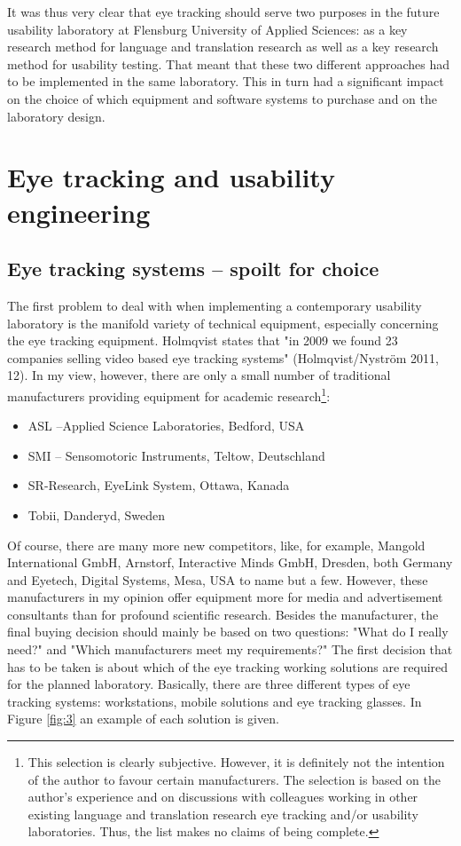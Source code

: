 \documentclass[output=paper]{langsci/langscibook}
\begin{document}
It was thus very clear that eye tracking should serve two purposes in the future usability laboratory at Flensburg University of Applied Sciences: as a key research method for language and translation research as well as a key research method for usability testing. That meant that these two different approaches had to be implemented in the same laboratory. This in turn had a significant impact on the choice of which equipment and software systems to purchase and on the laboratory design.


\section{Eye tracking and usability engineering }

\subsection{Eye tracking systems – spoilt for choice }

The first problem to deal with when implementing a contemporary usability laboratory is the manifold variety of technical equipment, especially concerning the eye tracking equipment. Holmqvist states that "in 2009 we found 23 companies selling video based eye tracking systems" (Holmqvist/Nyström 2011, 12). In my view, however, there are only a small number of traditional manufacturers providing equipment for academic research\footnote{ This selection is clearly subjective. However, it is definitely not the intention of the author to favour certain manufacturers. The selection is based on the author’s experience and on discussions with colleagues working in other existing language and translation research eye tracking and/or usability laboratories. Thus, the list makes no claims of being complete.}: 

\begin{itemize}
\item ASL –Applied Science Laboratories, Bedford, USA
\item SMI – Sensomotoric Instruments, Teltow, Deutschland
\item SR-Research, EyeLink System, Ottawa, Kanada
\item Tobii, Danderyd, Sweden 
\end{itemize}


Of course, there are many more new competitors, like, for example, Mangold International GmbH, Arnstorf, Interactive Minds GmbH, Dresden, both Germany and Eyetech, Digital Systems, Mesa, USA to name but a few. However, these manufacturers in my opinion offer equipment more for media and advertisement consultants than for profound scientific research. Besides the manufacturer, the final buying decision should mainly be based on two questions: "What do I really need?" and "Which manufacturers meet my requirements?" The first decision that has to be taken is about which of the eye tracking working solutions are required for the planned laboratory. Basically, there are three different types of eye tracking systems: workstations, mobile solutions and eye tracking glasses. In Figure \ref{fig:3} an example of each solution is given.
\end{document}
